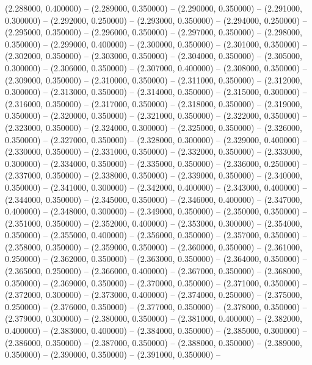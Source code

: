 (2.288000, 0.400000) -- 
(2.289000, 0.350000) -- 
(2.290000, 0.350000) -- 
(2.291000, 0.300000) -- 
(2.292000, 0.250000) -- 
(2.293000, 0.350000) -- 
(2.294000, 0.250000) -- 
(2.295000, 0.350000) -- 
(2.296000, 0.350000) -- 
(2.297000, 0.350000) -- 
(2.298000, 0.350000) -- 
(2.299000, 0.400000) -- 
(2.300000, 0.350000) -- 
(2.301000, 0.350000) -- 
(2.302000, 0.350000) -- 
(2.303000, 0.350000) -- 
(2.304000, 0.350000) -- 
(2.305000, 0.300000) -- 
(2.306000, 0.350000) -- 
(2.307000, 0.400000) -- 
(2.308000, 0.350000) -- 
(2.309000, 0.350000) -- 
(2.310000, 0.350000) -- 
(2.311000, 0.350000) -- 
(2.312000, 0.300000) -- 
(2.313000, 0.350000) -- 
(2.314000, 0.350000) -- 
(2.315000, 0.300000) -- 
(2.316000, 0.350000) -- 
(2.317000, 0.350000) -- 
(2.318000, 0.350000) -- 
(2.319000, 0.350000) -- 
(2.320000, 0.350000) -- 
(2.321000, 0.350000) -- 
(2.322000, 0.350000) -- 
(2.323000, 0.350000) -- 
(2.324000, 0.300000) -- 
(2.325000, 0.350000) -- 
(2.326000, 0.350000) -- 
(2.327000, 0.350000) -- 
(2.328000, 0.300000) -- 
(2.329000, 0.400000) -- 
(2.330000, 0.350000) -- 
(2.331000, 0.350000) -- 
(2.332000, 0.350000) -- 
(2.333000, 0.300000) -- 
(2.334000, 0.350000) -- 
(2.335000, 0.350000) -- 
(2.336000, 0.250000) -- 
(2.337000, 0.350000) -- 
(2.338000, 0.350000) -- 
(2.339000, 0.350000) -- 
(2.340000, 0.350000) -- 
(2.341000, 0.300000) -- 
(2.342000, 0.400000) -- 
(2.343000, 0.400000) -- 
(2.344000, 0.350000) -- 
(2.345000, 0.350000) -- 
(2.346000, 0.400000) -- 
(2.347000, 0.400000) -- 
(2.348000, 0.300000) -- 
(2.349000, 0.350000) -- 
(2.350000, 0.350000) -- 
(2.351000, 0.350000) -- 
(2.352000, 0.400000) -- 
(2.353000, 0.300000) -- 
(2.354000, 0.350000) -- 
(2.355000, 0.400000) -- 
(2.356000, 0.350000) -- 
(2.357000, 0.350000) -- 
(2.358000, 0.350000) -- 
(2.359000, 0.350000) -- 
(2.360000, 0.350000) -- 
(2.361000, 0.250000) -- 
(2.362000, 0.350000) -- 
(2.363000, 0.350000) -- 
(2.364000, 0.350000) -- 
(2.365000, 0.250000) -- 
(2.366000, 0.400000) -- 
(2.367000, 0.350000) -- 
(2.368000, 0.350000) -- 
(2.369000, 0.350000) -- 
(2.370000, 0.350000) -- 
(2.371000, 0.350000) -- 
(2.372000, 0.300000) -- 
(2.373000, 0.400000) -- 
(2.374000, 0.250000) -- 
(2.375000, 0.250000) -- 
(2.376000, 0.350000) -- 
(2.377000, 0.350000) -- 
(2.378000, 0.350000) -- 
(2.379000, 0.300000) -- 
(2.380000, 0.350000) -- 
(2.381000, 0.400000) -- 
(2.382000, 0.400000) -- 
(2.383000, 0.400000) -- 
(2.384000, 0.350000) -- 
(2.385000, 0.300000) -- 
(2.386000, 0.350000) -- 
(2.387000, 0.350000) -- 
(2.388000, 0.350000) -- 
(2.389000, 0.350000) -- 
(2.390000, 0.350000) -- 
(2.391000, 0.350000) -- 
